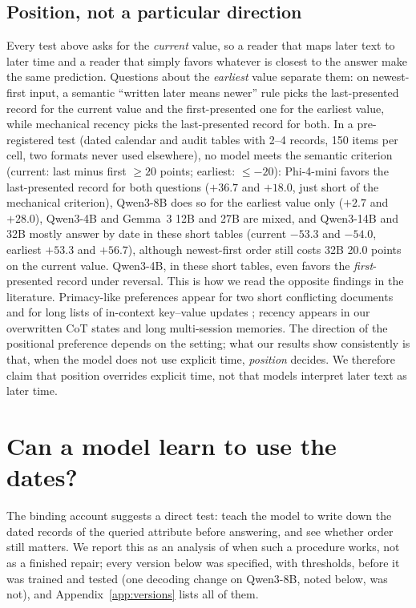 \documentclass[11pt]{article}
\begin{document}
\subsection{Position, not a particular direction}
\label{sec:rule}
Every test above asks for the \emph{current} value, so a reader that maps later text to later time and a reader that simply favors whatever is closest to the answer make the same prediction. Questions about the \emph{earliest} value separate them: on newest-first input, a semantic ``written later means newer'' rule picks the last-presented record for the current value and the first-presented one for the earliest value, while mechanical recency picks the last-presented record for both. In a pre-registered test (dated calendar and audit tables with 2--4 records, 150 items per cell, two formats never used elsewhere), no model meets the semantic criterion (current: last minus first $\geq 20$ points; earliest: $\leq -20$): Phi-4-mini favors the last-presented record for both questions ($+36.7$ and $+18.0$, just short of the mechanical criterion), Qwen3-8B does so for the earliest value only ($+2.7$ and $+28.0$), Qwen3-4B and Gemma~3 12B and 27B are mixed, and Qwen3-14B and 32B mostly answer by date in these short tables (current $-53.3$ and $-54.0$, earliest $+53.3$ and $+56.7$), although newest-first order still costs 32B 20.0 points on the current value. Qwen3-4B, in these short tables, even favors the \emph{first}-presented record under reversal.
This is how we read the opposite findings in the literature. Primacy-like preferences appear for two short conflicting documents \citep{fitch2026gemma,yang2026contextconflict} and for long lists of in-context key--value updates \citep{qiao2026retrieval,chattaraj2026first}; recency appears in our overwritten CoT states and long multi-session memories. The direction of the positional preference depends on the setting; what our results show consistently is that, when the model does not use explicit time, \emph{position} decides. We therefore claim that position overrides explicit time, not that models interpret later text as later time.

\section{Can a model learn to use the dates?}
\label{sec:procedure}

The binding account suggests a direct test: teach the model to write down the dated records of the queried attribute before answering, and see whether order still matters. We report this as an analysis of when such a procedure works, not as a finished repair; every version below was specified, with thresholds, before it was trained and tested (one decoding change on Qwen3-8B, noted below, was not), and Appendix~\ref{app:versions} lists all of them.
\end{document}
